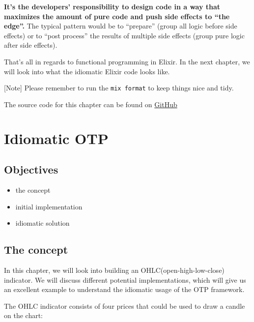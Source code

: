 \documentclass[
  oneside]{book}
\providecommand{\tightlist}{%
  \setlength{\itemsep}{0pt}\setlength{\parskip}{0pt}}
\begin{document}
\textbf{It's the developers' responsibility to design code in a way that maximizes the amount of pure code and push side effects to ``the edge''.} The typical pattern would be to ``prepare'' (group all logic before side effects) or to ``post process'' the results of multiple side effects (group pure logic after side effects).

That's all in regards to functional programming in Elixir. In the next chapter, we will look into what the idiomatic Elixir code looks like.

{[}Note{]} Please remember to run the \texttt{mix\ format} to keep things nice and tidy.

The source code for this chapter can be found on \href{https://github.com/Cinderella-Man/hands-on-elixir-and-otp-cryptocurrency-trading-bot-source-code/tree/chapter_18}{GitHub}

\chapter{Idiomatic OTP}\label{idiomatic-otp}

\section{Objectives}\label{objectives-18}

\begin{itemize}
\tightlist
\item
  the concept
\item
  initial implementation
\item
  idiomatic solution
\end{itemize}

\section{The concept}\label{the-concept}

In this chapter, we will look into building an OHLC(open-high-low-close) indicator. We will discuss different potential implementations, which will give us an excellent example to understand the idiomatic usage of the OTP framework.

The OHLC indicator consists of four prices that could be used to draw a candle on the chart:
\end{document}
